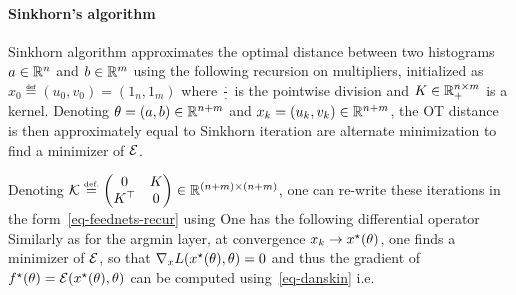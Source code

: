 \paragraph{Sinkhorn's algorithm}

Sinkhorn algorithm approximates the optimal distance between two histograms $a \in \mathbb{R}^n$ and $b \in \mathbb{R}^m$ using the following recursion on multipliers, initialized as $x_0 \eqdef (u_0,v_0) = (1_n,1_m)$
where $\frac{\cdot}{\cdot}$ is the pointwise division and $K \in \mathbb{R}_+^{n \times m}$ is a kernel.
%
Denoting $\theta=(a,b) \in \mathbb{R}^{n+m}$ and $x_k=(u_k,v_k) \in \mathbb{R}^{n+m}$, the OT distance is then approximately equal to 
Sinkhorn iteration are alternate minimization to find a minimizer of $\mathcal{E}$. 

Denoting  $\mathcal{K} \stackrel{\mbox{\upshape\tiny def.}}{=} \begin{pmatrix} 0 & K \\ K^\top & 0 \end{pmatrix} \in \mathbb{R}^{(n+m) \times (n+m)}$, one can re-write these iterations in the form~\eqref{eq-feednets-recur} using 
One has the following differential operator 
Similarly as for the argmin layer, at convergence $x_k \rightarrow x^\star(\theta)$, one finds a minimizer of $\mathcal{E}$, so that $\nabla_x L(x^\star(\theta),\theta)=0$ and thus the gradient of $f^\star(\theta)=\mathcal{E}(x^\star(\theta),\theta)$ can be computed using~\eqref{eq-danskin} i.e.



